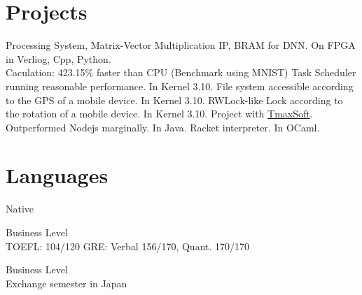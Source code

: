 \documentclass[10pt]{article} %
\begin{document}

\section{Projects}

{
Processing System, Matrix-Vector Multiplication IP, BRAM for DNN. On FPGA in Verliog, Cpp, Python.\\
Caculation: 423.15\% faster than CPU (Benchmark using MNIST)
}
{
Task Scheduler running reasonable performance. In Kernel 3.10.
}
{
File system accessible according to the GPS of a mobile device. In Kernel 3.10.
}
{
RWLock-like Lock according to the rotation of a mobile device. In Kernel 3.10.
}
{
Project with \href{https://kr.tmaxsoft.com/main.do}{TmaxSoft}. Outperformed Nodejs marginally. In Java.
}
{
Racket interpreter. In OCaml.
}


\section{Languages}

{
Native
}

{
Business Level\\
TOEFL: 104/120 \hspace{10mm} GRE: Verbal 156/170, Quant. 170/170
}

{
Business Level\\
Exchange semester in Japan
}
\end{document}
